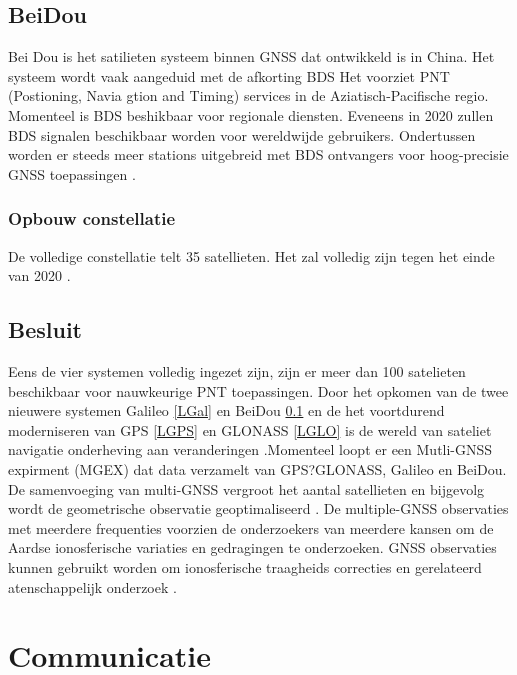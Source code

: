 \subsection{BeiDou}
\label{LBeD}
Bei Dou is het satilieten systeem binnen GNSS dat ontwikkeld is in China. Het systeem wordt vaak  aangeduid met de afkorting BDS \cite{LBibBeiDou} Het voorziet PNT (Postioning, Navia gtion and Timing) services in de Aziatisch-Pacifische regio. Momenteel is BDS  beshikbaar voor regionale diensten. Eveneens in 2020 zullen BDS signalen beschikbaar worden voor wereldwijde gebruikers. Ondertussen worden er steeds meer stations uitgebreid met BDS ontvangers voor hoog-precisie GNSS toepassingen \cite{LBibBeiDou}.

\subsubsection{Opbouw constellatie}
De volledige constellatie telt 35 satellieten. Het zal volledig zijn tegen het einde van 2020 \cite{LBibGNSS4}.

\subsection{Besluit}
Eens de vier systemen volledig ingezet zijn, zijn er meer dan 100 satelieten beschikbaar voor nauwkeurige PNT toepassingen. Door het opkomen van de twee nieuwere systemen Galileo \ref{LGal} en BeiDou \ref{LBeD} en de het voortdurend moderniseren van GPS \ref{LGPS} en GLONASS \ref{LGLO} is de wereld van sateliet navigatie onderheving aan veranderingen \cite{LBibGNSS4}.Momenteel loopt er een Mutli-GNSS expirment (MGEX) dat data verzamelt van GPS?GLONASS, Galileo en BeiDou. De samenvoeging van multi-GNSS vergroot het aantal satellieten en bijgevolg wordt de geometrische observatie geoptimaliseerd \cite{LBibGNSS5}. De multiple-GNSS observaties met meerdere frequenties voorzien de onderzoekers van meerdere kansen om de Aardse ionosferische variaties en gedragingen te onderzoeken. GNSS observaties kunnen gebruikt worden om ionosferische traagheids correcties en gerelateerd atenschappelijk onderzoek \cite{LBibBeiDou}.

\section{Communicatie}
\label{LCom}
